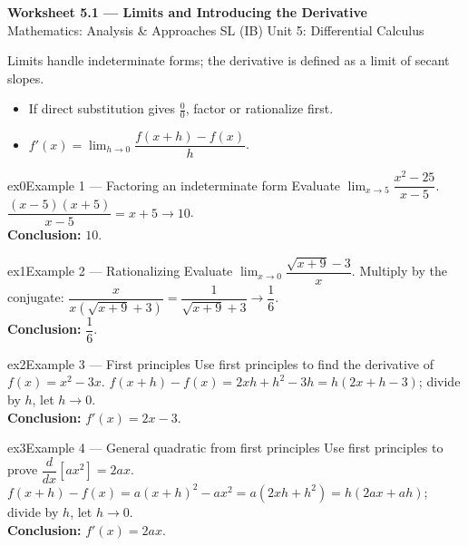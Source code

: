 \documentclass[11pt]{article}
\begin{document}
\begin{center}
{\LARGE\bfseries\color{titleblue}Worksheet 5.1 --- Limits and Introducing the Derivative}\\[2pt]
{\small Mathematics: Analysis \& Approaches SL (IB) \textperiodcentered{} Unit 5: Differential Calculus}
\end{center}

\begin{ideabox}
Limits handle indeterminate forms; the derivative is defined as a limit of secant slopes.
\begin{itemize}[leftmargin=*,itemsep=2pt]
  \item If direct substitution gives $\tfrac00$, factor or rationalize first.
  \item $f'(x)=\displaystyle\lim_{h\to0}\dfrac{f(x+h)-f(x)}{h}$.
\end{itemize}
\end{ideabox}


\begin{example}{ex0}{Example 1 --- Factoring an indeterminate form}
Evaluate $\displaystyle\lim_{x\to5}\dfrac{x^2-25}{x-5}$.\soln
$\dfrac{(x-5)(x+5)}{x-5}=x+5\to10$.\\[3pt]\textbf{Conclusion:} $10$.
\end{example}

\begin{example}{ex1}{Example 2 --- Rationalizing}
Evaluate $\displaystyle\lim_{x\to0}\dfrac{\sqrt{x+9}-3}{x}$.\soln
Multiply by the conjugate: $\dfrac{x}{x(\sqrt{x+9}+3)}=\dfrac{1}{\sqrt{x+9}+3}\to\dfrac16$.\\[3pt]\textbf{Conclusion:} $\dfrac16$.
\end{example}

\begin{example}{ex2}{Example 3 --- First principles}
Use first principles to find the derivative of $f(x)=x^2-3x$.\soln
$f(x+h)-f(x)=2xh+h^2-3h=h(2x+h-3)$; divide by $h$, let $h\to0$.\\[3pt]\textbf{Conclusion:} $f'(x)=2x-3$.
\end{example}

\begin{example}{ex3}{Example 4 --- General quadratic from first principles}
Use first principles to prove $\dfrac{d}{dx}[ax^2]=2ax$.\soln
$f(x+h)-f(x)=a(x+h)^2-ax^2=a(2xh+h^2)=h(2ax+ah)$; divide by $h$, let $h\to0$.\\[3pt]\textbf{Conclusion:} $f'(x)=2ax$.
\end{example}
\end{document}
